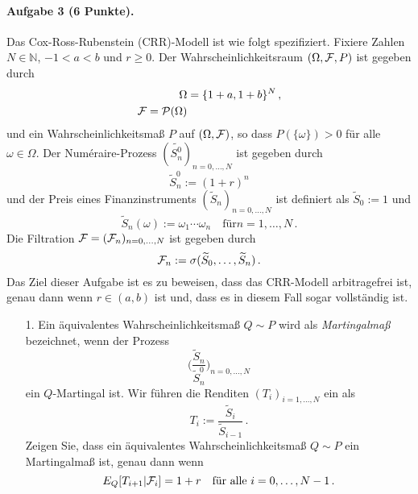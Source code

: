 \documentclass{article}
\begin{document}
\paragraph{Aufgabe 3 \textnormal{(6 Punkte)}.}
Das Cox-Ross-Rubenstein (CRR)-Modell ist wie folgt spezifiziert.
Fixiere Zahlen $N\in\mathbb{N}$, $-1<a<b$ und $r\geq0$.
Der Wahrscheinlichkeitsraum $(\Omega,{\cal F},P)$ ist gegeben durch
\begin{align*}
  \Omega&=\{1+a,1+b\}^N\,,\\
  {\cal F}={\cal P}(\Omega)
\end{align*}
und ein Wahrscheinlichkeitsmaß $P$ auf $(\Omega,{\cal F})$, so dass $P(\{\omega\})>0$ für alle $\omega\in\Omega$.
Der Numéraire-Prozess $(\widetilde{S_n^0})_{n=0,\dots,N}$ ist gegeben durch
\[
  \widetilde{S}_n^0:=(1+r)^n
\]
und der Preis eines Finanzinstruments $(\widetilde{S}_n)_{n=0,\dots,N}$ ist definiert als $\widetilde{S}_0:=1$ und
\[
  \widetilde{S}_n(\omega):=\omega_1\cdots\omega_n\quad\text{für}n=1,\dots,N\,.
\]
Die Filtration ${\cal F}=({\cal F}_n)_{n=0,\dots,N}$ ist gegeben durch
\[
{\cal F}_n:=\sigma(\widetilde{S}_0,\dots,\widetilde{S}_n)\,.
\]
Das Ziel dieser Aufgabe ist es zu beweisen, dass das CRR-Modell arbitragefrei ist, genau dann wenn $r\in(a,b)$ ist und, dass es in diesem Fall sogar vollständig ist.
\begin{itemize}
\item [1.] Ein äquivalentes Wahrscheinlichkeitsmaß $Q\sim P$ wird als \emph{Martingalmaß} bezeichnet, wenn der Prozess
  \[\biggl(\frac{\widetilde{S}_n}{\widetilde{S}_n^0}\biggr)_{n=0,\dots,N}\]
  ein $Q$-Martingal ist.
  Wir führen die Renditen $(T_i)_{i=1,\dots,N}$ ein als
  \[
    T_i:=\frac{\widetilde{S}_i}{\widetilde{S}_{i-1}}\,.
  \]
  Zeigen Sie, dass ein äquivalentes Wahrscheinlichkeitsmaß $Q\sim P$ ein Martingalmaß ist, genau dann wenn
  \[
    E_Q[T_{i+1}|{\cal F}_i]=1+r\quad\text{für alle }i=0,\dots,N-1\,.
  \]
\end{itemize}
\end{document}
